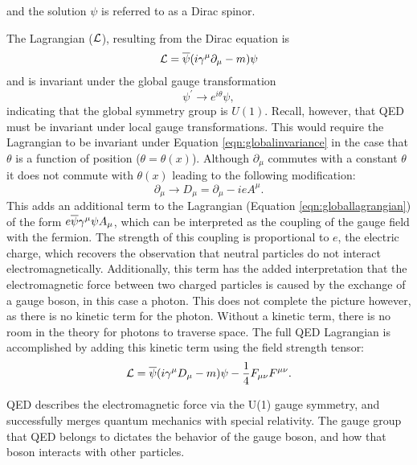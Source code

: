 and the solution $\psi$ is %
referred to as a Dirac spinor.

The Lagrangian ($\mathcal{L}$), resulting from the Dirac equation is
\begin{equation}
\label{eqn:globallagrangian}
\mathcal{L} = \overline{\psi}(i \gamma^{\mu}\partial_{\mu} - m)\psi
\end{equation}
and is invariant under the global gauge transformation
\begin{equation}
\label{eqn:globalinvariance}
\psi^{\prime}  \rightarrow e^{i\theta}\psi,
\end{equation}
indicating that the global symmetry group is $U(1)$.
Recall, however, that QED must be invariant under local gauge transformations.
This would require the Lagrangian to be invariant under Equation \ref{eqn:globalinvariance} in the case that $\theta$ is a function of position ($\theta = \theta(x)$).
Although $\partial_{\mu}$ commutes with a constant $\theta$ it does not commute with $\theta(x)$ leading to the following modification:
\begin{equation}
\partial_{\mu} \rightarrow D_{\mu} = \partial_{\mu} - ieA^{\mu}.
\end{equation}
This adds an additional term to the Lagrangian (Equation \ref{eqn:globallagrangian}) of the form $e\overline{\psi}\gamma^{\mu}\psi A_{\mu}$, which can be interpreted as the coupling of the gauge field with the fermion.
The strength of this coupling is proportional to $e$, the electric charge, which recovers the observation that neutral particles do not interact electromagnetically.
Additionally, this term has the added interpretation that the electromagnetic force between two charged particles is caused by the exchange of a gauge boson, in this case a photon.
This does not complete the picture however, as there is no kinetic term for the photon. 
Without a kinetic term, there is no room in the theory for photons to traverse space.
The full QED Lagrangian is accomplished by adding this kinetic term using the field strength tensor:
\begin{equation}
\label{eqn:qedlagrangian}
\mathcal{L} = \overline{\psi} (i\gamma^{\mu}D_{\mu} - m)\psi - \frac{1}{4}F_{\mu\nu}F^{\mu\nu}.
\end{equation}

QED describes the electromagnetic force via the U(1) gauge symmetry, and successfully merges quantum mechanics with special relativity.
The gauge group that QED belongs to dictates the behavior of the gauge boson, and how that boson interacts with other particles.

